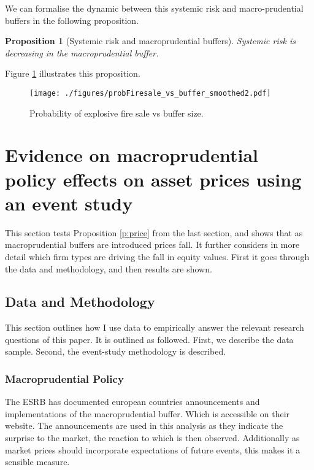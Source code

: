 \documentclass[11pt]{article}
\newtheorem{proposition}{Proposition}
\begin{document}
We can formalise the dynamic between this systemic risk and macro-prudential buffers in the following proposition. 

\begin{proposition}[Systemic risk and macroprudential buffers]
\label{p:risk}
Systemic risk is decreasing in the macroprudential buffer.
\end{proposition}

\noindent Figure \ref{f_probFSvsBuffer} illustrates this proposition.


\begin{figure}[h]
\centering
\texttt{[image: ./figures/probFiresale\_vs\_buffer\_smoothed2.pdf]}
\caption{Probability of explosive fire sale vs buffer size.\\ }
\label{f_probFSvsBuffer}
\end{figure}


\section{Evidence on macroprudential policy effects on asset prices using an event study} \label{sec:empiricalAnalysis}

This section tests Proposition \ref{p:price} from the last section, and shows that as macroprudential buffers are introduced prices fall. It further considers in more detail which firm types are driving the fall in equity values. First it goes through the data and methodology, %
and then results are shown.

\subsection{Data and Methodology}

This section outlines how I use data to empirically answer the relevant research questions of this paper. It is outlined as followed. First, we describe the data sample. Second, the event-study methodology is described.

\subsubsection*{Macroprudential Policy}
The ESRB has documented european countries announcements and implementations of the macroprudential buffer. Which is accessible on their website. The announcements are used in this analysis as they indicate the surprise to the market, the reaction to which is then observed. Additionally as market prices should incorporate expectations of future events, this makes it a sensible measure.
\end{document}
